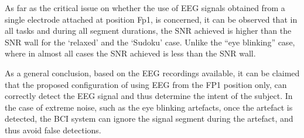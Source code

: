 As far as the critical issue on whether the use of EEG signals obtained from a single electrode attached at position Fp1, is concerned, it can be observed that in all tasks and during all segment durations, the SNR achieved is higher than the SNR wall for the ‘relaxed’ and the ‘Sudoku’ case. Unlike the “eye blinking” case, where in almost all cases the SNR achieved is less than the SNR wall.
      
As a general conclusion, based on the EEG recordings available, it can be claimed that the proposed configuration of using EEG from the FP1 position only, can correctly detect the EEG signal and thus determine the intent of the subject. In the case of extreme noise, such as the eye blinking artefacts, once the artefact is detected, the BCI system can ignore the signal segment during the artefact, and thus avoid false detections.  




